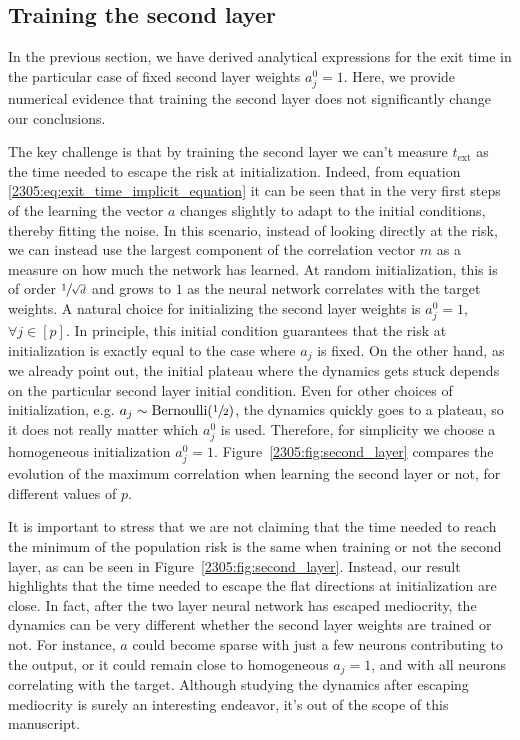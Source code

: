 \subsection{Training the second layer}\label{2305:subsec:second_layer}

In the previous section, we have derived analytical expressions for the exit time in the particular case of fixed second layer weights $a^{0}_{j}=1$. Here, we provide numerical evidence that training the second layer does not significantly change our conclusions.

The key challenge is that by training the second layer we can't measure \(t_\text{ext}\) as the time needed to escape the risk at initialization. Indeed, from equation  \eqref{2305:eq:exit_time_implicit_equation} it can be seen that in the very first steps of the learning the vector \(a\) changes slightly to adapt to the initial conditions, thereby fitting the noise. In this scenario, instead of looking directly at the risk, we can instead use the largest component of the correlation vector \(m\) as a measure on how much the network has learned. At random initialization, this is of order \(\sfrac{1}{\sqrt{d}}\) and grows to $1$ as the neural network correlates with the target weights. A natural choice for initializing the second layer weights is $a^0_j = 1$,  $\forall j \in [p]$. In principle, this initial condition guarantees that the risk at initialization is exactly equal to the case where \(a_j\) is fixed. On the other hand, as we already point out, the initial plateau where the dynamics gets stuck depends on the particular second layer initial condition. Even for other choices of initialization, e.g. \(a_j \sim \text{Bernoulli}(\sfrac12)\), the dynamics quickly goes to a plateau, so it does not really matter which \(a_j^0\) is used. Therefore, for simplicity we choose a homogeneous initialization \(a^0_j = 1\). Figure~\ref{2305:fig:second_layer} compares the evolution of the maximum correlation when learning the second layer or not, for different values of \(p\). 

It is important to stress that we are not claiming that the time needed to reach the minimum of the population risk is the same when training or not the second layer, as can be seen in Figure~\ref{2305:fig:second_layer}. Instead, our result highlights that the time needed to escape the flat directions at initialization are close. In fact, after the two layer neural network has escaped mediocrity, the dynamics can be very different whether the second layer weights are trained or not. For instance, \(a\) could become sparse with just a few neurons contributing to the output, or it could remain close to homogeneous \(a_j=1\), and with all neurons correlating with the target. Although studying the dynamics after escaping mediocrity is surely an interesting endeavor, it's out of the scope of this manuscript. 

